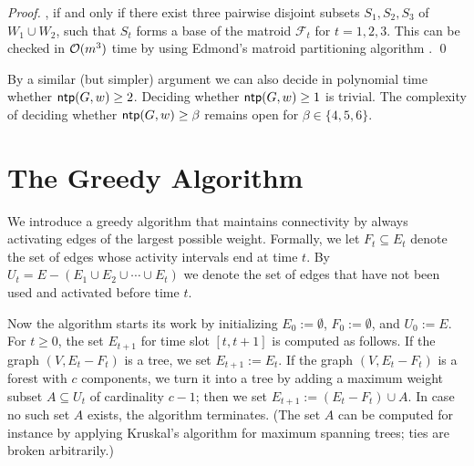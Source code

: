 \begin{proof}
, if and only if there exist three pairwise disjoint subsets
$S_1,S_2,S_3$ of $W_1 \cup W_2$, such that $S_t$ forms a base of the matroid $\mathcal{F}_t$ for $t=1,2,3$.
This can be checked in $\mathcal{O}(m^3)$ time by using Edmond's matroid partitioning algorithm \cite{edmonds1965minimum}.
\qed
\end{proof}

By a similar (but simpler) argument we can also decide in polynomial time whether $\operatorname{\textsf{ntp}}(G,w)\ge2$.
Deciding whether $\operatorname{\textsf{ntp}}(G,w)\ge1$ is trivial.
The complexity of deciding whether $\operatorname{\textsf{ntp}}(G,w)\ge\beta$ remains open for $\beta\in\{4,5,6\}$.


\section{The Greedy Algorithm}
\label{sec:greedy}
We introduce a greedy algorithm that maintains connectivity by always
activating edges of the largest possible weight.
Formally, we let $F_t\subseteq E_t$ denote the set of edges whose activity intervals 
end at time $t$.
By $U_t=E-(E_1\cup E_2\cup\cdots\cup E_t)$ we denote the set of edges that have not been 
used and activated before time $t$.

Now the {\greedy} algorithm starts its work by initializing 
$E_0:=\emptyset$, $F_0:=\emptyset$, and $U_0:=E$.
For $t\ge0$, the set $E_{t+1}$ for time slot $[t,t+1]$ is computed as follows.
If the graph $(V,E_t-F_t)$ is a tree, we set $E_{t+1}:=E_t$.
If the graph $(V,E_t-F_t)$ is a forest with $c$ components, we turn it into 
a tree by adding a maximum weight subset $A\subseteq U_t$ of cardinality $c-1$;
then we set $E_{t+1}:=(E_t-F_t)\cup A$.
In case no such set $A$ exists, the {\greedy} algorithm terminates.
(The set $A$ can be computed for instance by applying Kruskal's algorithm for 
maximum spanning trees; ties are broken arbitrarily.)

